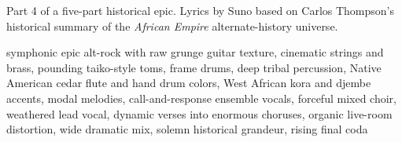 
\begin{notes}
Part 4 of a five-part historical epic. Lyrics by Suno based on Carlos Thompson's historical summary of the \emph{African Empire} alternate-history universe.
\end{notes}
\begin{style}
symphonic epic alt-rock with raw grunge guitar texture, cinematic strings and brass, pounding taiko-style toms, frame drums, deep tribal percussion, Native American cedar flute and hand drum colors, West African kora and djembe accents, modal melodies, call-and-response ensemble vocals, forceful mixed choir, weathered lead vocal, dynamic verses into enormous choruses, organic live-room distortion, wide dramatic mix, solemn historical grandeur, rising final coda
\end{style}

